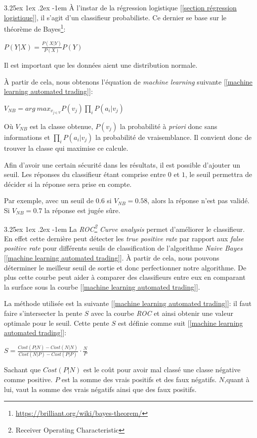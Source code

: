 \documentclass[a4paper, 11pt]{article}
\makeatletter
\renewcommand\paragraph{\@startsection{paragraph}{5}{\z@}%
  {3.25ex \@plus1ex \@minus.2ex}%
  {-1em}%
  {\normalfont\normalsize\bfseries}}
\makeatother
\begin{document}
\paragraph{}
À l'instar de la régression logistique [\ref{section régression logistique}], il s'agit d'un classifieur probabiliste. Ce dernier se base sur le théorème de Bayes\footnote{\url{https://brilliant.org/wiki/bayes-theorem/}}:
\begin{center}
$P(Y|X) = \frac{P(X|Y)}{P(X)}P(Y)$
\end{center}
Il est important que les données aient une distribution normale.

À partir de cela, nous obtenons l'équation de \textit{machine learning} suivante [\ref{machine learning automated trading}]:
\begin{center}
$V_{NB} = arg\ max_{v_{j \in V}} P(v_j) \prod\limits_i P(a_i | v_j)$
\end{center}
Où $V_{NB}$ est la classe obtenue, $P(v_j)$ la probabilité à \textit{priori} donc sans informations et $\prod\limits_i P(a_i | v_j)$ la probabilité de vraisemblance.
Il convient donc de trouver la classe qui maximise ce calcule.

Afin d'avoir une certain sécurité dans les résultats, il est possible d'ajouter un seuil. Les réponses du classifieur étant comprise entre $0$ et $1$, le seuil permettra de décider si la réponse sera prise en compte.

Par exemple, avec un seuil de $0.6$ si $V_{NB} = 0.58$, alors la réponse n'est pas validé. Si $V_{NB} = 0.7$ la réponse est jugée sûre. 

\paragraph{}\label{section roc curve analysis}
La \textit{ROC\footnote{Receiver Operating Characteristic} Curve analysis} permet d'améliorer le classifieur. En effet cette dernière peut détecter les \textit{true positive rate} par rapport aux \textit{false positive rate} pour différents seuils de classification de l'algorithme \textit{Naive Bayes} [\ref{machine learning automated trading}]. À partir de cela, nous pouvons déterminer le meilleur seuil de sortie et donc perfectionner notre algorithme.
De plus cette courbe peut aider à comparer des classifieurs entre eux en comparant la surface sous la courbe [\ref{machine learning automated trading}].

La méthode utilisée est la suivante [\ref{machine learning automated trading}]: il faut faire s'intersecter la pente $S$ avec la courbe \textit{ROC} et ainsi obtenir une valeur optimale pour le seuil.
Cette pente $S$ est définie comme suit [\ref{machine learning automated trading}]:
\begin{center}
$S = \frac{Cost(P|N) - Cost(N|N)}{Cost(N|P) - Cost(P|P)} \cdot \frac{N}{P}$
\end{center}
Sachant que $Cost(P|N)$ est le coût pour avoir mal classé une classe négative comme positive. $P$ est la somme des vrais positifs et des faux négatifs. $N$,quant à lui, vaut la somme des vrais négatifs ainsi que des faux positifs.
\end{document}
